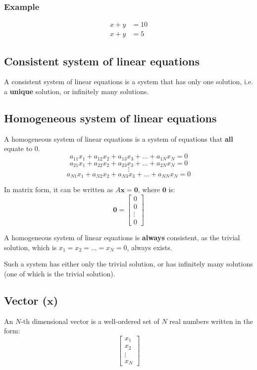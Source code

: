 \documentclass[11pt]{article}
\begin{document}
\subsubsection{Example}
\label{sec:orge9d7eea}
\begin{align*}
x + y &= 10 \\
x + y &= 5
\end{align*}
\subsection{Consistent system of linear equations}
\label{sec:org5fb75e5}
A consistent system of linear equations is a system that has only one solution, i.e. a \textbf{unique} solution, or infinitely many solutions.

 \newpage
\subsection{Homogeneous system of linear equations}
\label{sec:orgb7fd5df}
A homogeneous system of linear equations is a system of equations that \textbf{all} equate to 0.
\[a_{11}x_1 + a_{12}x_2 + a_{13}x_3 + \ldots + a_{1N}x_{N} = 0\]
\[a_{21}x_1 + a_{22}x_2 + a_{23}x_3 + \ldots + a_{2N}x_{N} = 0\]
\[\vdots\]
\[a_{N1}x_1 + a_{N2}x_2 + a_{N3}x_3 + \ldots + a_{NN}x_{N} = 0\]

In matrix form, it can be written as \(A \boldsymbol{x} = \boldsymbol{0}\), where \(\boldsymbol{0}\) is:
\begin{displaymath}
\boldsymbol{0} = \begin{bmatrix}
0 \\
0 \\
\vdots \\
0
\end{bmatrix}
\end{displaymath}

A homogeneous system of linear equations is \textbf{always} consistent, as the trivial solution, which is \(x_1 = x_2 = \ldots = x_N = 0\), always exists.

Such a system has either only the trivial solution, or has infinitely many solutions (one of which is the trivial solution).
\subsection{Vector (\(\boldsymbol{x}\))}
\label{sec:org9da6a67}
An \(N\)-th dimensional vector is a well-ordered set of \(N\) real numbers written in the form:
\begin{displaymath}
\begin{bmatrix}
x_1 \\
x_2 \\
\vdots \\
x_N
\end{bmatrix}
\end{displaymath}
\end{document}
